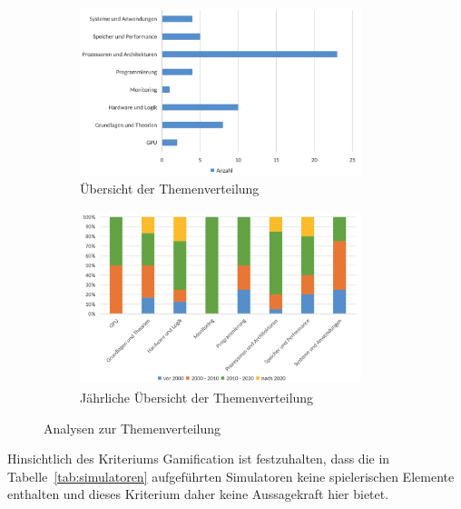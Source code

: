 \begin{figure}[!htbp]
    \centering
    \begin{subfigure}[b]{0.48\textwidth}
        \centering
        \includegraphics[width=0.90\textwidth]{graphics_sim/7-thema.png}
        \caption{Übersicht der Themenverteilung}
        \label{fig:7-thema}
    \end{subfigure}
    \hfill
    \begin{subfigure}[b]{0.48\textwidth}
        \centering
        \includegraphics[width=0.90\textwidth]{graphics_sim/8-thema-jahr.png}
        \caption{Jährliche Übersicht der Themenverteilung}
        \label{fig:8-thema-jahr}
    \end{subfigure}
    \caption{Analysen zur Themenverteilung}
    \label{fig:themen-gesamt}
\end{figure}

Hinsichtlich des Kriteriums Gamification ist festzuhalten, dass die in Tabelle~\ref{tab:simulatoren} aufgeführten Simulatoren keine spielerischen Elemente enthalten und dieses Kriterium daher keine Aussagekraft hier bietet.

